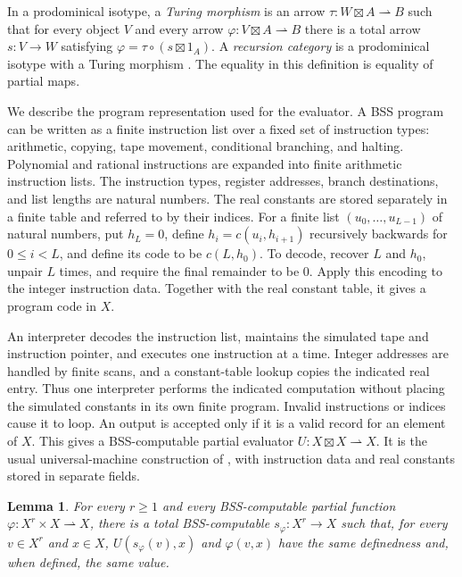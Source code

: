 \documentclass[11pt]{article}
\newtheorem{lemma}[theorem]{Lemma}
\newcommand{\pfn}{\rightharpoonup}
\begin{document}
In a prodominical isotype, a \emph{Turing morphism} is an arrow
$\tau:W\boxtimes A\pfn B$ such that for every object $V$ and
every arrow $\varphi:V\boxtimes A\pfn B$ there is a total arrow
$s:V\to W$ satisfying
$\varphi=\tau\circ(s\boxtimes1_A)$.
A \emph{recursion category} is a prodominical isotype with a Turing
morphism \cite[\S9, pp.~1264--1265]{Heller90}.
The equality in this definition is equality of partial maps.

We describe the program representation used for the evaluator.
A BSS program can be written as a finite instruction list over a fixed
set of instruction types: arithmetic, copying, tape movement,
conditional branching, and halting. Polynomial and rational
instructions are expanded into finite arithmetic instruction lists.
The instruction types, register addresses, branch destinations, and
list lengths are natural numbers. The real constants are stored
separately in a finite table and referred to by their indices.
For a finite list $(u_0,\ldots,u_{L-1})$ of natural numbers, put
$h_L=0$, define $h_i=c(u_i,h_{i+1})$ recursively backwards for $0\leq i<L$,
and define its code to be $c(L,h_0)$. To decode, recover $L$ and
$h_0$, unpair $L$ times, and require the final remainder to be $0$.
Apply this encoding to the integer instruction data. Together
with the real constant table, it gives a program code in $X$.

An interpreter decodes the instruction list, maintains the simulated
tape and instruction pointer, and executes one instruction at a time.
Integer addresses are handled by finite scans, and a constant-table
lookup copies the indicated real entry. Thus one interpreter performs
the indicated computation without placing the simulated constants in
its own finite program. Invalid instructions or indices cause it to
loop. An output is accepted only if it is a valid record for an
element of $X$. This gives a BSS-computable partial evaluator
$U:X\boxtimes X\pfn X$. It is the usual universal-machine
construction of \cite[\S8, pp.~34--36]{BSS89}, with instruction
data and real constants stored in separate fields.

\begin{lemma}\label{lem:specialization}
For every $r\geq1$ and every BSS-computable partial function
$\varphi:X^r\times X\pfn X$, there is a total BSS-computable
$s_\varphi:X^r\to X$ such that, for every $v\in X^r$ and $x\in X$,
$U(s_\varphi(v),x)$ and $\varphi(v,x)$ have the same definedness
and, when defined, the same value.
\end{lemma}
\end{document}
